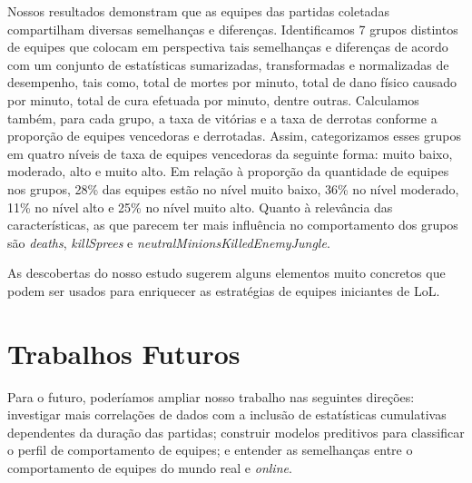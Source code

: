 Nossos resultados demonstram que as equipes das partidas coletadas compartilham diversas semelhanças e diferenças. Identificamos 7 grupos distintos de equipes que colocam em perspectiva tais semelhanças e diferenças de acordo com um conjunto de estatísticas sumarizadas, transformadas e normalizadas de desempenho, tais como, total de mortes por minuto, total de dano físico causado por minuto, total de cura efetuada por minuto, dentre outras. Calculamos também, para cada grupo, a taxa de vitórias e a taxa de derrotas conforme a proporção de equipes vencedoras e derrotadas. Assim, categorizamos esses grupos em quatro níveis de taxa de equipes vencedoras da seguinte forma: muito baixo, moderado, alto e muito alto. Em relação à proporção da quantidade de equipes nos grupos, 28\% das equipes estão no nível muito baixo, 36\% no nível moderado, 11\% no nível alto e 25\% no nível muito alto. Quanto à relevância das características, as que parecem ter mais influência no comportamento dos grupos são \textit{deaths}, \textit{killSprees} e \textit{neutralMinionsKilledEnemyJungle}.

As descobertas do nosso estudo sugerem alguns elementos muito concretos que podem ser usados para enriquecer as estratégias de equipes iniciantes de LoL.

\section{Trabalhos Futuros}
Para o futuro, poderíamos ampliar nosso trabalho nas seguintes direções: investigar mais correlações de dados com a inclusão de estatísticas cumulativas dependentes da duração das partidas; construir modelos preditivos para classificar o perfil de comportamento de equipes; e entender as semelhanças entre o comportamento de equipes do mundo real e \textit{online}.

